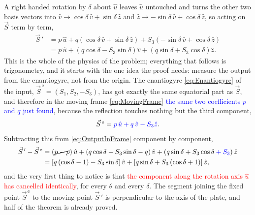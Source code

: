             A right handed rotation by $\delta$ about $\hat{u}$ leaves $\hat{u}$ untouched and turns the other two basis vectors into $\hat{v}\to\cos\delta\,\hat{v}+\sin\delta\,\hat{z}$ and $\hat{z}\to-\sin\delta\,\hat{v}+\cos\delta\,\hat{z}$, so acting on $\vec{S}$ term by term,
            \begin{align}
                \vec{S}\,' &= p\,\hat{u} + q\left(\cos\delta\,\hat{v}+\sin\delta\,\hat{z}\right) + S_3\left(-\sin\delta\,\hat{v}+\cos\delta\,\hat{z}\right) \nonumber \\
                &= p\,\hat{u} + \left(q\cos\delta-S_3\sin\delta\right)\hat{v} + \left(q\sin\delta+S_3\cos\delta\right)\hat{z}. \label{eq:OutputInFrame}
            \end{align}
            This is the whole of the physics of the problem; everything that follows is trigonometry, and it starts with the one idea the proof needs: measure the output from the enantiogyre, not from the origin. The enantiogyre \ref{eq:Enantiogyre} of the input, $\vec{S}^{\,\text{e}}=\left(S_1,S_2,-S_3\right)$, has got exactly the same equatorial part as $\vec{S}$, and therefore in the moving frame \ref{eq:MovingFrame} \textcolor{blue}{the same two coefficients $p$ and $q$ just found}, because the reflection touches nothing but the third component,
            \begin{equation*}
                \vec{S}^{\,\text{e}} = \textcolor{blue}{p\,\hat{u}+q\,\hat{v}-S_3\hat{z}} .
            \end{equation*}
            Subtracting this from \ref{eq:OutputInFrame} component by component,
            \begin{align*}
                \vec{S}\,'-\vec{S}^{\,\text{e}} &= \left(\cancel{p-p}\right)\hat{u} + \left(q\cos\delta-S_3\sin\delta-q\right)\hat{v} + \left(q\sin\delta+S_3\cos\delta\textcolor{blue}{{}+S_3}\right)\hat{z} \\
                &= \left[q\left(\cos\delta-1\right)-S_3\sin\delta\right]\hat{v} + \left[q\sin\delta+S_3\left(\cos\delta+1\right)\right]\hat{z},
            \end{align*}
            and the very first thing to notice is that \textcolor{red}{the component along the rotation axis $\hat{u}$ has cancelled identically}, for every $\theta$ and every $\delta$. The segment joining the fixed point $\vec{S}^{\,\text{e}}$ to the moving point $\vec{S}\,'$ is perpendicular to the axis of the plate, and half of the theorem is already proved.

